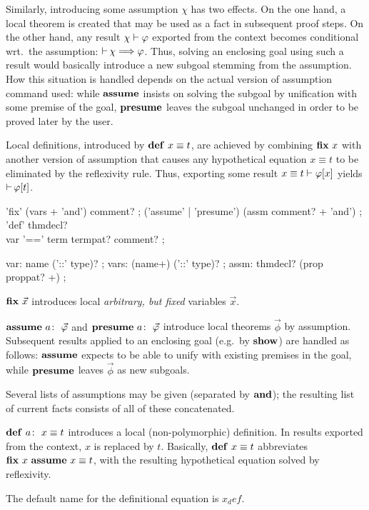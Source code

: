 Similarly, introducing some assumption $\chi$ has two effects.  On the one
hand, a local theorem is created that may be used as a fact in subsequent
proof steps.  On the other hand, any result $\chi \mathrel{\vdash} \varphi$ exported from the
context becomes conditional wrt.\ the assumption: $\mathop{\mathrel{\vdash}}\nolimits \chi \Longrightarrow \varphi$.
Thus, solving an enclosing goal using such a result would basically introduce
a new subgoal stemming from the assumption.  How this situation is handled
depends on the actual version of assumption command used: while ${\mathord{\mathbf{assume}}}$
insists on solving the subgoal by unification with some premise of the goal,
${\mathord{\mathbf{presume}}}$ leaves the subgoal unchanged in order to be proved later by the
user.

Local definitions, introduced by $\DEF{}{x \equiv t}$, are achieved by
combining ${\mathord{\mathbf{fix}}}~x$ with another version of assumption that causes any
hypothetical equation $x \equiv t$ to be eliminated by the reflexivity rule.
Thus, exporting some result $x \equiv t \mathrel{\vdash} \varphi[x]$ yields $\mathop{\mathrel{\vdash}}\nolimits \varphi[t]$.

\begin{rail}
  'fix' (vars + 'and') comment?
  ;
  ('assume' | 'presume') (assm comment? + 'and')
  ;
  'def' thmdecl? \\ var '==' term termpat? comment?
  ;

  var: name ('::' type)?
  ;
  vars: (name+) ('::' type)?
  ;
  assm: thmdecl? (prop proppat? +)
  ;
\end{rail}

\begin{descr}
\item [${\mathord{\mathbf{fix}}}~\vec x$] introduces local \emph{arbitrary, but fixed} variables
  $\vec x$.
\item [$\ASSUME{a}{\vec\phi}$ and $\PRESUME{a}{\vec\phi}$] introduce local
  theorems $\vec\phi$ by assumption.  Subsequent results applied to an
  enclosing goal (e.g.\ by ${\mathord{\mathbf{show}}}$) are handled as follows: ${\mathord{\mathbf{assume}}}$
  expects to be able to unify with existing premises in the goal, while
  ${\mathord{\mathbf{presume}}}$ leaves $\vec\phi$ as new subgoals.
  
  Several lists of assumptions may be given (separated by
  ${\mathord{\mathbf{and}}}$); the resulting list of current facts consists of all of
  these concatenated.
\item [$\DEF{a}{x \equiv t}$] introduces a local (non-polymorphic) definition.
  In results exported from the context, $x$ is replaced by $t$.  Basically,
  $\DEF{}{x \equiv t}$ abbreviates $\FIX{x}~\ASSUME{}{x \equiv t}$, with the
  resulting hypothetical equation solved by reflexivity.
  
  The default name for the definitional equation is $x_def$.
\end{descr}

